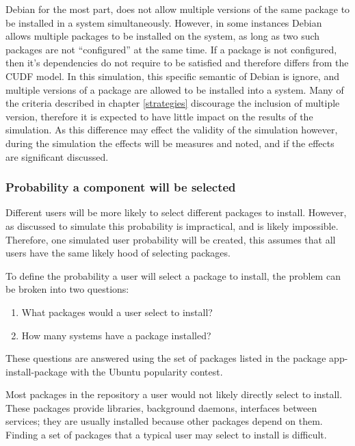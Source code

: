 Debian for the most part, does not allow multiple versions of the same package to be installed in a system simultaneously.
However, in some instances Debian allows multiple packages to be installed on the system, as long as two such packages are not ``configured'' at the same time.
If a package is not configured, then it's dependencies do not require to be satisfied and therefore differs from the CUDF model.
In this simulation, this specific semantic of Debian is ignore, and multiple versions of a package are allowed to be installed into a system.
Many of the criteria described in chapter \ref{strategies} discourage the inclusion of multiple version,
therefore it is expected to have little impact on the results of the simulation.
As this difference may effect the validity of the simulation however, during the simulation the effects will be measures and noted, and if the effects are significant discussed.


\subsubsection{Probability a component will be selected}
Different users will be more likely to select different packages to install.
However, as discussed to simulate this probability is impractical, and is likely impossible.
Therefore, one simulated user probability will be created, this assumes that all users have the same likely hood of selecting packages.

To define the probability a user will select a package to install, the problem can be broken into two questions:
\begin{enumerate}
  \item What packages would a user select to install?
  \item How many systems have a package installed?
\end{enumerate}
These questions are answered using the set of packages listed in the package app-install-package with the Ubuntu popularity contest.

Most packages in the repository a user would not likely directly select to install.
These packages provide libraries, background daemons, interfaces between services; they are usually installed because other packages depend on them.
Finding a set of packages that a typical user may select to install is difficult.

